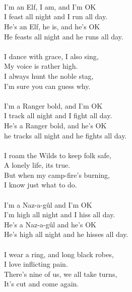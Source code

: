 \begin{multicols}{2}
\\
\\
\\
I’m an Elf, I am, and I’m OK
\\
I feast all night and I run all day.
\\
He’s an Elf, he is, and he’s OK
\\
He feasts all night and he runs all day.
\\
\\
I dance with grace, I also sing,
\\
My voice is rather high.
\\
I always hunt the noble stag,
\\
I’m sure you can guess why.
\\
\\
I’m a Ranger bold, and I’m OK
\\
I track all night and I fight all day.
\\
He’s a Ranger bold, and he’s OK
\\
he tracks all night and he fights all day.
\\
\\
I roam the Wilds to keep folk safe,
\\
A lonely life, its true.
\\
But when my camp-fire’s burning,
\\
I know just what to do.
\\
\\
I’m a Naz-a-g\^ul and I’m OK
\\
I’m high all night and I hiss all day.
\\
He’s a Naz-a-g\^ul and he’s OK
\\
He’s high all night and he hisses all day.
\\
\\
I wear a ring, and long black robes,
\\
I love inflicting pain.
\\
There’s nine of us, we all take turns,
\\
It’s cut and come again.

\end{multicols}
